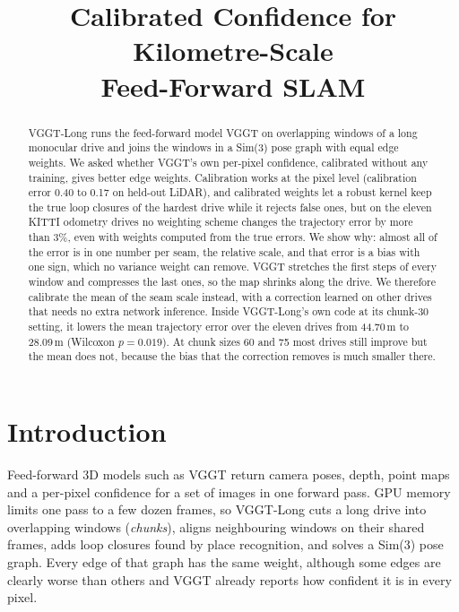 \documentclass[conference]{IEEEtran}
\begin{document}
\title{Calibrated Confidence for Kilometre-Scale\\Feed-Forward SLAM}

\author{
}

\maketitle

\begin{abstract}
VGGT-Long runs the feed-forward model VGGT on overlapping windows of a long monocular drive and joins the windows in a
Sim(3) pose graph with equal edge weights. We asked whether VGGT's own per-pixel confidence, calibrated without any
training, gives better edge weights. Calibration works at the pixel level (calibration error 0.40 to 0.17 on held-out
LiDAR), and calibrated weights let a robust kernel keep the true loop closures of the hardest drive while it rejects
false ones, but on the eleven KITTI
odometry drives no weighting scheme changes the trajectory error by more than 3\%, even with weights computed from the
true errors. We show why: almost all of the error is in one number per seam, the relative scale, and that error is a
bias with one sign, which no variance weight can remove. VGGT stretches the first steps of every window and compresses
the last ones, so the map shrinks along the drive. We therefore calibrate the mean of the seam scale instead, with a
correction learned on other drives that needs no extra network inference. Inside VGGT-Long's own code at its chunk-30
setting, it lowers the mean trajectory error over the eleven drives from 44.70\,m to 28.09\,m (Wilcoxon $p=0.019$). At
chunk sizes 60 and 75 most drives still improve but the mean does not, because the bias that the correction removes is
much smaller there.
\end{abstract}

\section{Introduction}

Feed-forward 3D models such as VGGT \cite{vggt} return camera poses, depth, point maps and a per-pixel confidence for a
set of images in one forward pass. GPU memory limits one pass to a few dozen frames, so VGGT-Long \cite{vggtlong} cuts a
long drive into overlapping windows (\emph{chunks}), aligns neighbouring windows on their shared frames, adds loop
closures found by place recognition, and solves a Sim(3) pose graph. Every edge of that graph has the same weight,
although some edges are clearly worse than others and VGGT already reports how confident it is in every pixel.
\end{document}
